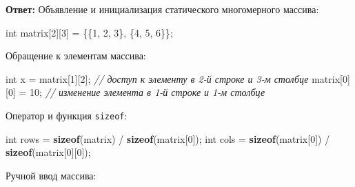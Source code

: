 \documentclass[
]{article}
\newenvironment{Shaded}{}{}
\newcommand{\CommentTok}[1]{\textcolor[rgb]{0.38,0.63,0.69}{\textit{#1}}}
\newcommand{\DataTypeTok}[1]{\textcolor[rgb]{0.56,0.13,0.00}{#1}}
\newcommand{\DecValTok}[1]{\textcolor[rgb]{0.25,0.63,0.44}{#1}}
\newcommand{\KeywordTok}[1]{\textcolor[rgb]{0.00,0.44,0.13}{\textbf{#1}}}
\newcommand{\NormalTok}[1]{#1}
\newcommand{\OperatorTok}[1]{\textcolor[rgb]{0.40,0.40,0.40}{#1}}
\begin{document}
\begin{enumerate}
  \textbf{Ответ:} Объявление и инициализация статического многомерного
  массива:

\begin{Shaded}
\begin{Highlighting}[]
\DataTypeTok{int}\NormalTok{ matrix}\OperatorTok{[}\DecValTok{2}\OperatorTok{][}\DecValTok{3}\OperatorTok{]} \OperatorTok{=} \OperatorTok{\{\{}\DecValTok{1}\OperatorTok{,} \DecValTok{2}\OperatorTok{,} \DecValTok{3}\OperatorTok{\},} \OperatorTok{\{}\DecValTok{4}\OperatorTok{,} \DecValTok{5}\OperatorTok{,} \DecValTok{6}\OperatorTok{\}\};}
\end{Highlighting}
\end{Shaded}

  Обращение к элементам массива:

\begin{Shaded}
\begin{Highlighting}[]
\DataTypeTok{int}\NormalTok{ x }\OperatorTok{=}\NormalTok{ matrix}\OperatorTok{[}\DecValTok{1}\OperatorTok{][}\DecValTok{2}\OperatorTok{];} \CommentTok{// доступ к элементу в 2{-}й строке и 3{-}м столбце}
\NormalTok{matrix}\OperatorTok{[}\DecValTok{0}\OperatorTok{][}\DecValTok{0}\OperatorTok{]} \OperatorTok{=} \DecValTok{10}\OperatorTok{;} \CommentTok{// изменение элемента в 1{-}й строке и 1{-}м столбце}
\end{Highlighting}
\end{Shaded}

  Оператор и функция \texttt{sizeof}:

\begin{Shaded}
\begin{Highlighting}[]
\DataTypeTok{int}\NormalTok{ rows }\OperatorTok{=} \KeywordTok{sizeof}\OperatorTok{(}\NormalTok{matrix}\OperatorTok{)} \OperatorTok{/} \KeywordTok{sizeof}\OperatorTok{(}\NormalTok{matrix}\OperatorTok{[}\DecValTok{0}\OperatorTok{]);}
\DataTypeTok{int}\NormalTok{ cols }\OperatorTok{=} \KeywordTok{sizeof}\OperatorTok{(}\NormalTok{matrix}\OperatorTok{[}\DecValTok{0}\OperatorTok{])} \OperatorTok{/} \KeywordTok{sizeof}\OperatorTok{(}\NormalTok{matrix}\OperatorTok{[}\DecValTok{0}\OperatorTok{][}\DecValTok{0}\OperatorTok{]);}
\end{Highlighting}
\end{Shaded}

  Ручной ввод массива:


\end{enumerate}
\end{document}
